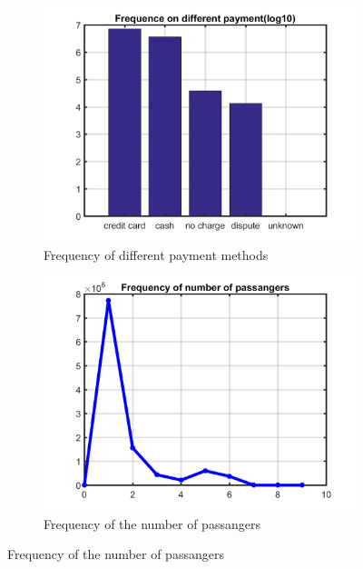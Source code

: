 \documentclass{article}
\begin{document}
\begin{figure}
\centering
\begin{subfigure}{.5\linewidth}
  \centering
  \includegraphics[width=.8\linewidth]{frequency-payment}
  \caption{Frequency of different payment methods}
  \label{fig:sub1}
\end{subfigure}%
\begin{subfigure}{.5\linewidth}
  \centering
  \includegraphics[width=.8\linewidth]{passange_frequency}
  \caption{Frequency of the number of passangers}
  \label{fig:sub2}
\end{subfigure}


\end{figure}
\end{document}
